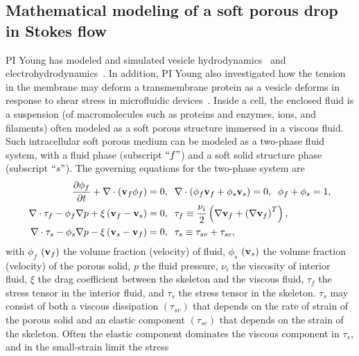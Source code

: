 \documentclass[11pt]{article}
\begin{document}
\subsection{Mathematical modeling of a soft porous drop in Stokes flow} 
\label{subsec:math_modeling}
PI Young has modeled and simulated vesicle
hydrodynamics~\cite{Veerapaneni2011_PRL, Vlahovska2011_JFM} and
electrohydrodynamics~\cite{HuLai2016_JCP, Nganguia2013_PRE}.  In
addition, PI Young also investigated how the tension in the membrane may
deform a transmembrane protein as a vesicle deforms in response to shear
stress in microfluidic devices~\cite{Pak2015_PNAS, Peng2016_AMS}. Inside
a cell, the enclosed fluid is a suspension (of macromolecules such as
proteins and enzymes, ions, and filaments) often modeled as a soft
porous structure immersed in a viscous fluid.  Such intracellular soft
porous medium can be modeled as a two-phase fluid system, with a fluid
phase (subscript $``f"$) and a soft solid structure phase (subscript
$``s"$).  The governing equations for the two-phase system
are~\cite{Young2019_PRF}
\begin{align}
\label{eq:geq1}
\frac{\partial \phi_f}{\partial t} + \nabla \cdot \left({\bf v}_f \phi_f\right) &= 0,\;\; \nabla \cdot \left(\phi_f {\bf v}_f + \phi_s {\bf v}_s \right) =0,\;\;\phi_f + \phi_s = 1,\\
%
\label{eq:geq2}
\nabla \cdot {\tau}_f -\phi_f \nabla p +\xi\left({\bf v}_f - {\bf v}_s\right) &=0,\;\; \tau_f\equiv \frac{\nu_i}{2}\left(\nabla {\bf v}_f + \left(\nabla{\bf v}_f\right)^T\right), \\
%
\label{eq:geq3}
\nabla \cdot {\tau}_s-\phi_s \nabla p -\xi \left({\bf v}_s - {\bf v}_f\right) &=0,\;\; \tau_s\equiv \tau_{sv}+\tau_{se},
\end{align}
with $\phi_f$ $({\bf v}_f)$ the volume fraction (velocity) of fluid,
$\phi_s$  $({\bf v}_s)$ the volume fraction (velocity) of the porous
solid, $p$ the fluid pressure, $\nu_i$ the viscosity of interior fluid,
$\xi$ the drag coefficient between the skeleton and the viscous fluid,
$\tau_f$  the stress tensor in the interior fluid, and $\tau_s$ the
stress tensor in the skeleton. $\tau_s$ may consist of both a viscous
dissipation $(\tau_{sv})$ that depends on the rate of strain of the
porous solid and an elastic component $(\tau_{se})$ that depends on the
strain of the skeleton.  Often the elastic component dominates the
viscous component in $\tau_s$,  and in the small-strain limit the stress
\end{document}

